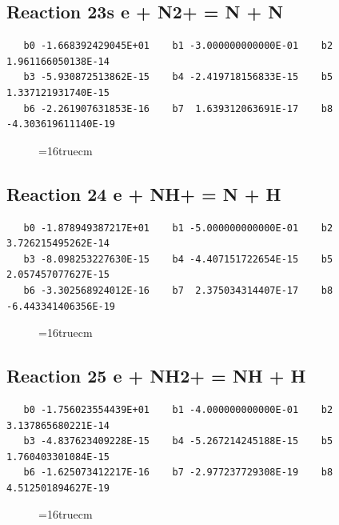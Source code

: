 \documentclass[12pt,dvipdfm]{article}
\begin{document}
\subsection{
Reaction 23s e + N2+ = N + N}
\begin{small}\begin{verbatim}
   b0 -1.668392429045E+01    b1 -3.000000000000E-01    b2  1.961166050138E-14
   b3 -5.930872513862E-15    b4 -2.419718156833E-15    b5  1.337121931740E-15
   b6 -2.261907631853E-16    b7  1.639312063691E-17    b8 -4.303619611140E-19
   \end{verbatim}\end{small}
\begin{figure}[h!]
\label{n2rates}
\epsfxsize=16truecm
\end{figure}
\newpage

\subsection{
Reaction 24 e + NH+ = N + H}
\begin{small}\begin{verbatim}
   b0 -1.878949387217E+01    b1 -5.000000000000E-01    b2  3.726215495262E-14
   b3 -8.098253227630E-15    b4 -4.407151722654E-15    b5  2.057457077627E-15
   b6 -3.302568924012E-16    b7  2.375034314407E-17    b8 -6.443341406356E-19
   \end{verbatim}\end{small}
\begin{figure}[h!]
\label{n2rates}
\epsfxsize=16truecm
\end{figure}
\newpage

\subsection{
Reaction 25 e + NH2+ = NH + H}
\begin{small}\begin{verbatim}
   b0 -1.756023554439E+01    b1 -4.000000000000E-01    b2  3.137865680221E-14
   b3 -4.837623409228E-15    b4 -5.267214245188E-15    b5  1.760403301084E-15
   b6 -1.625073412217E-16    b7 -2.977237729308E-19    b8  4.512501894627E-19
   \end{verbatim}\end{small}
\begin{figure}[h!]
\label{n2rates}
\epsfxsize=16truecm
\end{figure}
\newpage
\end{document}
